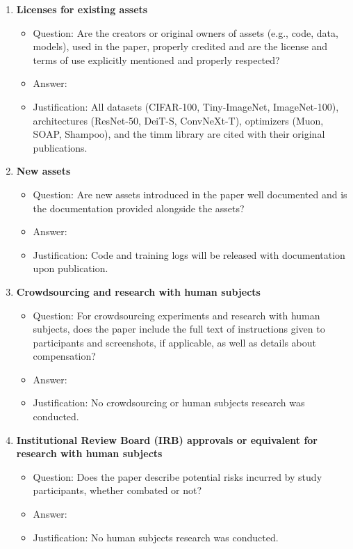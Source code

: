 \documentclass{article}
\begin{document}
\begin{enumerate}
\item {\bf Licenses for existing assets}
    \begin{itemize}
        \item[] Question: Are the creators or original owners of assets (e.g., code, data, models), used in the paper, properly credited and are the license and terms of use explicitly mentioned and properly respected?
        \item[] Answer: \answerYes{}
        \item[] Justification: All datasets (CIFAR-100, Tiny-ImageNet, ImageNet-100), architectures (ResNet-50, DeiT-S, ConvNeXt-T), optimizers (Muon, SOAP, Shampoo), and the timm library are cited with their original publications.
    \end{itemize}

\item {\bf New assets}
    \begin{itemize}
        \item[] Question: Are new assets introduced in the paper well documented and is the documentation provided alongside the assets?
        \item[] Answer: \answerYes{}
        \item[] Justification: Code and training logs will be released with documentation upon publication.
    \end{itemize}

\item {\bf Crowdsourcing and research with human subjects}
    \begin{itemize}
        \item[] Question: For crowdsourcing experiments and research with human subjects, does the paper include the full text of instructions given to participants and screenshots, if applicable, as well as details about compensation?
        \item[] Answer: \answerNA{}
        \item[] Justification: No crowdsourcing or human subjects research was conducted.
    \end{itemize}

\item {\bf Institutional Review Board (IRB) approvals or equivalent for research with human subjects}
    \begin{itemize}
        \item[] Question: Does the paper describe potential risks incurred by study participants, whether combated or not?
        \item[] Answer: \answerNA{}
        \item[] Justification: No human subjects research was conducted.
    \end{itemize}


\end{enumerate}
\end{document}
